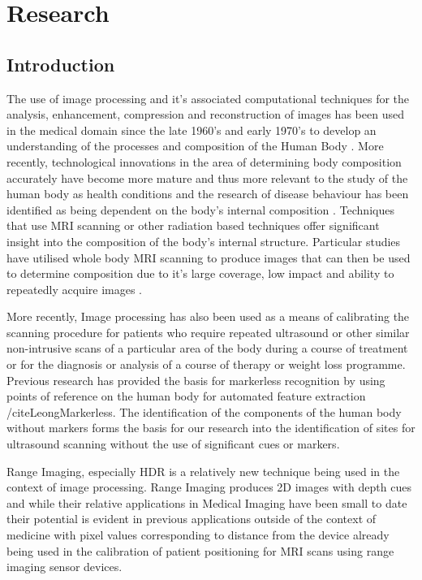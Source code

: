 \chapter{Research}

\label{research}

\section{Introduction}

The use of image processing and it's associated computational techniques for the analysis, enhancement, compression and reconstruction of images has been used in the medical domain since the late 1960's and early 1970's to develop an understanding of the processes and composition of the Human Body \cite{HansonHistory}. 
More recently, technological innovations in the area of determining body composition accurately have become more mature \cite{WeyersBodpod} and thus more relevant to the study of the human body as health conditions and the research of disease behaviour has been identified as being dependent on the body's internal composition \cite{SteinkampComposition}. 
Techniques that use MRI scanning or other radiation based techniques offer significant insight into the composition of the body's internal structure. 
Particular studies have utilised whole body MRI scanning to produce images that can then be used to determine composition due to it's large coverage, low impact and ability to repeatedly acquire images \cite{KullbergMRI}. 

More recently, Image processing has also been used as a means of calibrating the scanning procedure for patients who require repeated ultrasound or other similar non-intrusive scans of a particular area of the body during a course of treatment or for the diagnosis or analysis of a course of therapy or weight loss programme. 
Previous research has provided the basis for markerless recognition by using points of reference on the human body for automated feature extraction /cite{LeongMarkerless}. 
The identification of the components of the human body without markers forms the basis for our research into the identification of sites for ultrasound scanning without the use of significant cues or markers.

Range Imaging, especially HDR is a relatively new technique being used in the context of image processing. 
Range Imaging produces 2D images with depth cues and while their relative applications in Medical Imaging have been small to date their potential is evident in previous applications outside of the context of medicine with pixel values corresponding to distance from the device already being used in the calibration of patient positioning for MRI scans using range imaging sensor devices.

